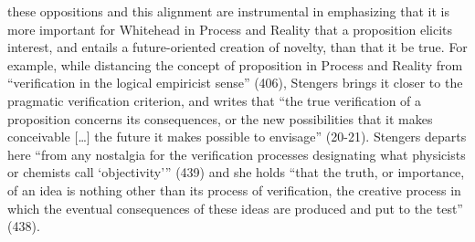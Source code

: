 %


these oppositions and this alignment are instrumental in emphasizing that it is
more important for Whitehead in Process and Reality that a proposition elicits
interest, and entails a future-oriented creation of novelty, than that it be true.
For
example, while distancing the concept of proposition in Process and Reality from
“verification in the logical empiricist sense” (406), Stengers brings it closer to the
pragmatic verification criterion, and writes that “the true verification of a proposition
concerns its consequences, or the new possibilities that it makes conceivable […] the
future it makes possible to envisage” (20-21).
Stengers departs here “from any
nostalgia for the verification processes designating what physicists or chemists call
‘objectivity’” (439) and she holds “that the truth, or importance, of an idea is nothing
other than its process of verification, the creative process in which the eventual
consequences of these ideas are produced and put to the test” (438).

